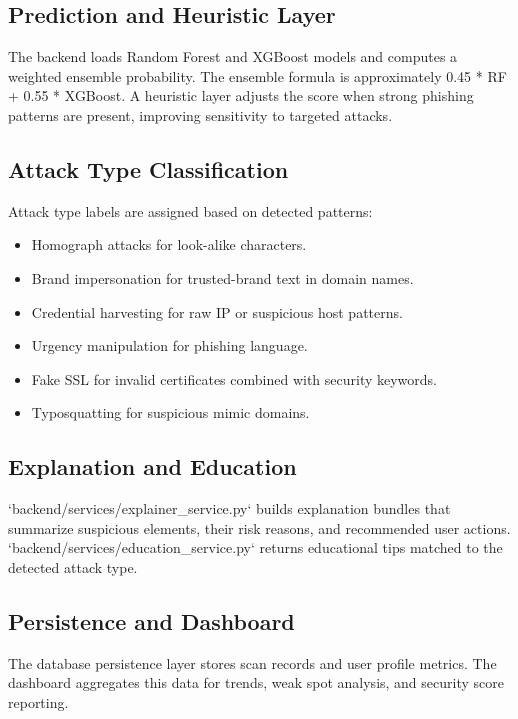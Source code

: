 \documentclass[conference]{IEEEtran}
\begin{document}
\subsection{Prediction and Heuristic Layer}
The backend loads Random Forest and XGBoost models and computes a weighted ensemble probability. The ensemble formula is approximately 0.45 * RF + 0.55 * XGBoost. A heuristic layer adjusts the score when strong phishing patterns are present, improving sensitivity to targeted attacks.

\subsection{Attack Type Classification}
Attack type labels are assigned based on detected patterns:
\begin{itemize}[itemsep=0pt,topsep=0pt]
    \item Homograph attacks for look-alike characters.
    \item Brand impersonation for trusted-brand text in domain names.
    \item Credential harvesting for raw IP or suspicious host patterns.
    \item Urgency manipulation for phishing language.
    \item Fake SSL for invalid certificates combined with security keywords.
    \item Typosquatting for suspicious mimic domains.
\end{itemize}

\subsection{Explanation and Education}
`backend/services/explainer_service.py` builds explanation bundles that summarize suspicious elements, their risk reasons, and recommended user actions. `backend/services/education_service.py` returns educational tips matched to the detected attack type.

\subsection{Persistence and Dashboard}
The database persistence layer stores scan records and user profile metrics. The dashboard aggregates this data for trends, weak spot analysis, and security score reporting.
\end{document}
